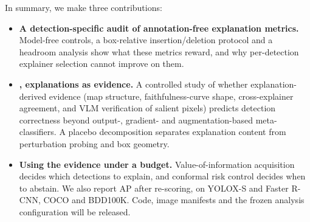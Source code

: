 
\noindent In summary, we make three contributions:
\begin{itemize}
  \item \textbf{A detection-specific audit of annotation-free explanation
  metrics.} Model-free controls, a box-relative insertion/deletion protocol
  and a headroom analysis show what these metrics reward, and why
  per-detection explainer selection cannot improve on them.
  \item \textbf{\method, explanations as evidence.} A controlled study of
  whether explanation-derived evidence (map structure, faithfulness-curve
  shape, cross-explainer agreement, and VLM verification of salient pixels)
  predicts detection correctness beyond output-, gradient- and
  augmentation-based meta-classifiers. A placebo decomposition separates
  explanation content from perturbation probing and box geometry.
  \item \textbf{Using the evidence under a budget.} Value-of-information
  acquisition decides which detections to explain, and conformal risk control
  decides when to abstain. We also report AP after re-scoring, on YOLOX-S and
  Faster R-CNN, COCO and BDD100K. Code, image manifests and the frozen
  analysis configuration will be released.
\end{itemize}
